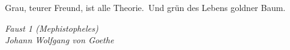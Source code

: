 \epigraph{
	Grau, teurer Freund, ist alle Theorie.\footnotemark\ 
	Und grün des Lebens goldner Baum.
}{\textit{
	Faust 1 (Mephistopheles) \\ Johann Wolfgang von Goethe}}
